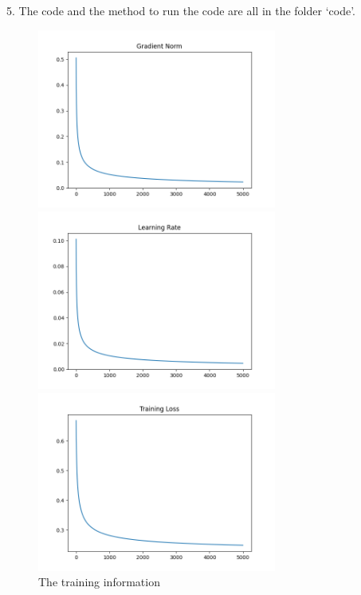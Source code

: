 5. The code and the method to run the code are all in the folder `code'.

\begin{figure}[htbp]
  \centerline{\includegraphics[width=0.7\textwidth]{../image/grad_norm.png}}
  \centerline{\includegraphics[width=0.7\textwidth]{../image/learning_rate.png}}
  \centerline{\includegraphics[width=0.7\textwidth]{../image/training_loss.png}}
  \caption{The training information}
  \label{fig:training}
\end{figure}

